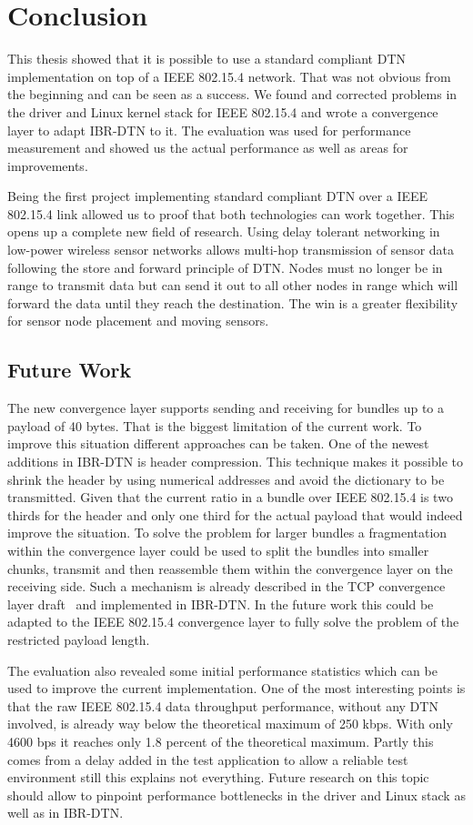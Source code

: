 \chapter{Conclusion}
This thesis showed that it is possible to use a standard compliant DTN
implementation on top of a IEEE 802.15.4 network. That was not obvious from the
beginning and can be seen as a success. We found and corrected problems in the
driver and Linux kernel stack for IEEE 802.15.4 and wrote a convergence layer to
adapt IBR-DTN to it. The evaluation was used for performance measurement and
showed us the actual performance as well as areas for improvements.

Being the first project implementing standard compliant DTN over a IEEE 802.15.4
link allowed us to proof that both technologies can work together. This opens up
a complete new field of research. Using delay tolerant networking in low-power
wireless sensor networks allows multi-hop transmission of sensor data following
the store and forward principle of DTN. Nodes must no longer be in range to
transmit data but can send it out to all other nodes in range which will forward
the data until they reach the destination. The win is a greater flexibility for
sensor node placement and moving sensors.

\section{Future Work}
The new convergence layer supports sending and receiving for bundles up to a
payload of 40 bytes. That is the biggest limitation of the current work. To
improve this situation different approaches can be taken. One of the newest
additions in IBR-DTN is header compression. This technique makes it possible to
shrink the header by using numerical addresses and avoid the dictionary to be
transmitted. Given that the current ratio in a bundle over IEEE 802.15.4 is two
thirds for the header and only one third for the actual payload that would indeed
improve the situation. To solve the problem for larger bundles a fragmentation
within the convergence layer could be used to split the bundles into smaller
chunks, transmit and then reassemble them within the convergence layer on the
receiving side. Such a mechanism is already described in the TCP convergence
layer draft~\cite{tcp-clayer-draft} and implemented in IBR-DTN. In the future
work this could be adapted to the IEEE 802.15.4 convergence layer to fully
solve the problem of the restricted payload length.

The evaluation also revealed some initial performance statistics which can be
used to improve the current implementation. One of the most interesting points
is that the raw IEEE 802.15.4 data throughput performance, without any DTN
involved, is already way below the theoretical maximum of 250 kbps. With only
4600 bps it reaches only 1.8 percent of the theoretical maximum. Partly this
comes from a delay added in the test application to allow a reliable test
environment still this explains not everything. Future research on this topic
should allow to pinpoint performance bottlenecks in the driver and Linux stack
as well as in IBR-DTN.

